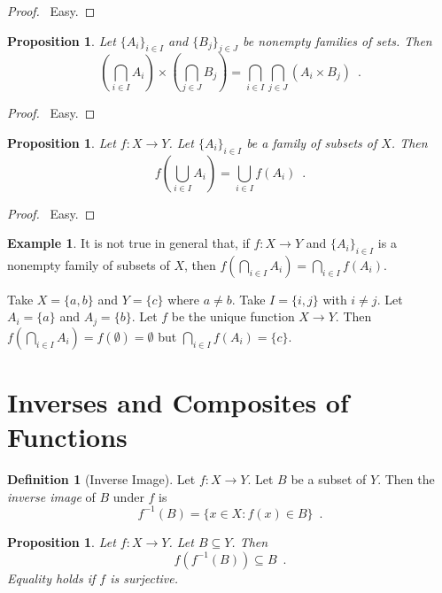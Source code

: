 \documentclass{report}
\let\qed\relax
\newtheorem{prop}[ax]{Proposition}
\theoremstyle{definition}
\newtheorem{df}[ax]{Definition}
\newtheorem{ex}[ax]{Example}
\begin{document}
\begin{proof}
\pf\ Easy. \qed
\end{proof}

\begin{prop}
Let $\{A_i\}_{i \in I}$ and $\{B_j\}_{j \in J}$ be nonempty families of sets. Then
\[ \left( \bigcap_{i \in I} A_i \right) \times \left( \bigcap_{j \in J} B_j \right) = \bigcap_{i \in I} \bigcap_{j \in J} (A_i \times B_j) \enspace . \]
\end{prop}

\begin{proof}
\pf\ Easy. \qed
\end{proof}

\begin{prop}
Let $f : X \rightarrow Y$. Let $\{A_i\}_{i \in I}$ be a family of subsets of $X$. Then
\[ f \left( \bigcup_{i \in I} A_i \right) = \bigcup_{i \in I} f(A_i) \enspace . \]
\end{prop}

\begin{proof}
\pf\ Easy. \qed
\end{proof}

\begin{ex}
It is not true in general that, if $f : X \rightarrow Y$ and $\{A_i\}_{i \in I}$ is a nonempty family of subsets of $X$, then $f \left( \bigcap_{i \in I} A_i \right) = \bigcap_{i \in I} f(A_i)$.

Take $X = \{a,b\}$ and $Y = \{c\}$ where $a \neq b$. Take $I = \{i,j\}$ with $i \neq j$. Let $A_i = \{a\}$ and $A_j = \{b\}$. Let $f$ be the unique function $X \rightarrow Y$. Then $f \left( \bigcap_{i \in I} A_i \right) = f(\emptyset) = \emptyset$ but $\bigcap_{i \in I} f(A_i) = \{c\}$.
\end{ex}

\section{Inverses and Composites of Functions}

\begin{df}[Inverse Image]
Let $f : X \rightarrow Y$. Let $B$ be a subset of $Y$. Then the \emph{inverse image} of $B$ under $f$ is
\[ f^{-1}(B) = \{ x \in X : f(x) \in B \} \enspace . \]
\end{df}

\begin{prop}
Let $f : X \rightarrow Y$. Let $B \subseteq Y$. Then
\[ f(f^{-1}(B)) \subseteq B \enspace . \]
Equality holds if $f$ is surjective.
\end{prop}
\end{document}
